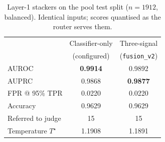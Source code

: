 \documentclass[journal]{IEEEtran}
\newcommand{\best}[1]{\textbf{#1}}
\begin{document}
\setcounter{table}{5}
\begin{table}[h]
\caption{Layer-1 stackers on the pool test split ($n=1912$, balanced). Identical
inputs; scores quantised as the router serves them.}
\label{abr:tab:l1}
\centering
\footnotesize
\begin{tabular}{@{}lcc@{}}
\toprule
 & Classifier-only & Three-signal \\
 & (configured) & (\texttt{fusion\_v2}) \\
\midrule
AUROC              & \best{0.9914} & 0.9892 \\
AUPRC              & 0.9868 & \best{0.9877} \\
FPR @ 95\% TPR     & 0.0220 & 0.0220 \\
Accuracy           & 0.9629 & 0.9629 \\
Referred to judge  & 15 & 15 \\
Temperature $T^\star$ & 1.1908 & 1.1891 \\
\bottomrule
\end{tabular}
\end{table}
\end{document}
